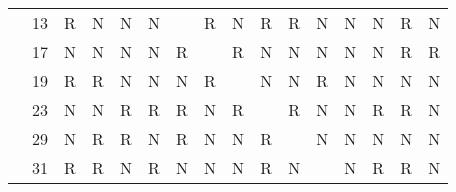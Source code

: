 \documentclass[17pt]{memoir}
\begin{document}
\begin{tabular}{@{}ll|llllllllllllll@{}}
                     & 13                       & \cellcolor[HTML]{FAC22B}R & N                         & N                         & N                         & \cellcolor[HTML]{000000}  & \cellcolor[HTML]{FAC22B}R & N                         & \cellcolor[HTML]{FAC22B}R & \cellcolor[HTML]{FAC22B}R & N                         & N                         & N                         & \cellcolor[HTML]{FAC22B}R & N                         \\
                     & 17                       & N                         & N                         & N                         & N                         & \cellcolor[HTML]{FAC22B}R & \cellcolor[HTML]{000000}  & \cellcolor[HTML]{FAC22B}R & N                         & N                         & N                         & N                         & N                         & \cellcolor[HTML]{FAC22B}R & \cellcolor[HTML]{FAC22B}R \\
                     & 19                       & \cellcolor[HTML]{FAC22B}R & \cellcolor[HTML]{FAC22B}R & N                         & N                         & N                         & \cellcolor[HTML]{FAC22B}R & \cellcolor[HTML]{000000}  & N                         & N                         & \cellcolor[HTML]{FAC22B}R & N                         & N                         & N                         & N                         \\
                     & 23                       & N                         & N                         & \cellcolor[HTML]{FAC22B}R & \cellcolor[HTML]{FAC22B}R & \cellcolor[HTML]{FAC22B}R & N                         & \cellcolor[HTML]{FAC22B}R & \cellcolor[HTML]{000000}  & \cellcolor[HTML]{FAC22B}R & N                         & N                         & \cellcolor[HTML]{FAC22B}R & \cellcolor[HTML]{FAC22B}R & N                         \\
                     & 29                       & N                         & \cellcolor[HTML]{FAC22B}R & \cellcolor[HTML]{FAC22B}R & N                         & \cellcolor[HTML]{FAC22B}R & N                         & N                         & \cellcolor[HTML]{FAC22B}R & \cellcolor[HTML]{000000}  & N                         & N                         & N                         & N                         & N                         \\
                     & 31                       & \cellcolor[HTML]{FAC22B}R & \cellcolor[HTML]{FAC22B}R & N                         & \cellcolor[HTML]{FAC22B}R & N                         & N                         & N                         & \cellcolor[HTML]{FAC22B}R & N                         & \cellcolor[HTML]{000000}  & N                         & \cellcolor[HTML]{FAC22B}R & \cellcolor[HTML]{FAC22B}R & N                         \\

\end{tabular}
\end{document}
